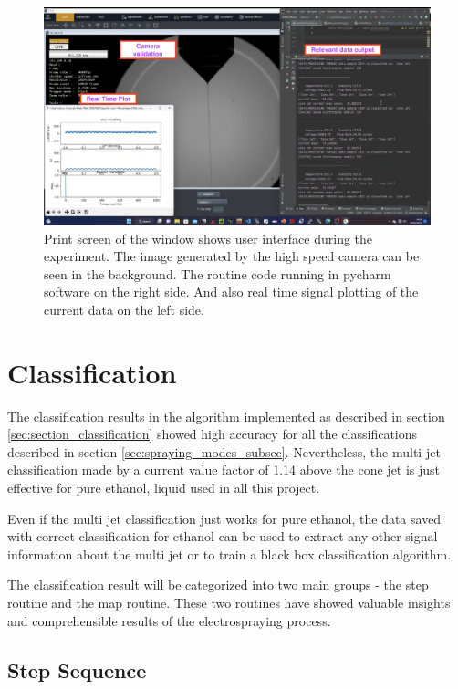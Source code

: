 \begin{figure}[H]
    \center
    \includegraphics[width=16cm]{Figuras/19:03/axs1.png}
    \caption{Print screen of the window shows user interface during the experiment.
        The image generated by the high speed camera can be seen in the background.
        The routine code running in pycharm software on the right side.
        And also real time signal plotting of the current data on the left side.}
        \label{fig:multi_class_exp1}
\end{figure}


\section{Classification}
\label{sec:classification_results}

The classification results in the algorithm implemented as described in section \ref{sec:section_classification} showed high accuracy for all the classifications described in section \ref{sec:spraying_modes_subsec}.
Nevertheless, the multi jet classification made by a current value factor of 1.14 above the cone jet is just effective for pure ethanol, liquid used in all this project.

Even if the multi jet classification just works for pure ethanol, the data saved with correct classification for ethanol can be used to extract any other signal information about the multi jet or to train a black box classification algorithm.

The classification result will be categorized into two main groups - the step routine and the map routine. These two routines have showed valuable insights and comprehensible results of the electrospraying process.


\subsection{Step Sequence}
\label{subsec:step_results}

